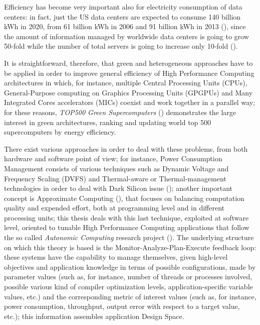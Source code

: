 Efficiency has become very important also for electricity consumption of data centers: in fact, just the US data centers are expected to consume 140 billion kWh in 2020, from 61 billion kWh in 2006 and 91 billion kWh in 2013 (\cite{site:NRDC2015}), since the amount of information managed by worldwide data centers is going to grow 50-fold while the number of total servers is going to increase only 10-fold (\cite{gantz2011extracting}).

It is straightforward, therefore, that green and heterogeneous approaches have to be applied in order to improve general efficiency of High Performance Computing architectures in which, for instance, multiple Central Processing Units (CPUs), General-Purpose computing on Graphics Processing Units (GPGPUs) and Many Integrated Cores accelerators (MICs) coexist and work together in a parallel way; for these reasons, \textit{TOP500 Green Supercomputers} (\cite{site:topGreen500}) demonstrates the large interest in green architectures, ranking and updating world top 500 supercomputers by energy efficiency.

There exist various approaches in order to deal with these problems, from both hardware and software point of view; for instance, Power Consumption Management consists of various techniques such as Dynamic Voltage and Frequency Scaling (DVFS) and Ther\-mal-aware or Ther\-mal-management technologies in order to deal with Dark Silicon issue (\cite{mittal2014power}); another important concept is Approximate Computing (\cite{mittal2016survey}), that focuses on balancing computation quality and expended effort, both at programming level and in different processing units; this thesis deals with this last technique, exploited at software level, oriented to tunable High Performance Computing applications that follow the so called \textit{Autonomic Computing} research project (\cite{kephart2003vision}). The underlying structure on which this theory is based is the Monitor-Analyze-Plan-Execute feedback loop: these systems have the capability to manage themselves, given high-level objectives and application knowledge in terms of possible configurations, made by parameter values (such as, for instance, number of threads or processes involved, possible various kind of compiler optimization levels, application-specific variable values, etc.) and the corresponding metric of interest values (such as, for instance, power consumption, throughput, output error with respect to a target value, etc.); this information assembles application Design Space.

